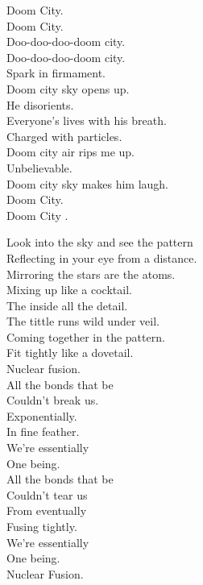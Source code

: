 Doom City. \\
Doom City. \\

Doo-doo-doo-doom city. \\
Doo-doo-doo-doom city. \\

Spark in firmament. \\
Doom city sky opens up. \\
He disorients. \\
Everyone's lives with his breath. \\
Charged with particles. \\
Doom city air rips me up. \\
Unbelievable. \\
Doom city sky makes him laugh. \\

Doom City. \\
Doom City . \\




Look into the sky and see the pattern \\
Reflecting in your eye from a distance. \\
Mirroring the stars are the atoms. \\
Mixing up like a cocktail. \\

The  inside all the detail. \\
The tittle runs wild under veil. \\
Coming together in the pattern. \\
Fit tightly like a dovetail. \\

Nuclear fusion. \\

All the bonds that be \\
Couldn't break us. \\
Exponentially. \\
In fine feather. \\
We're essentially \\
One being. \\

All the bonds that be \\
Couldn't tear us \\
From eventually \\
Fusing tightly. \\
We're essentially \\
One being. \\
Nuclear Fusion. \\

